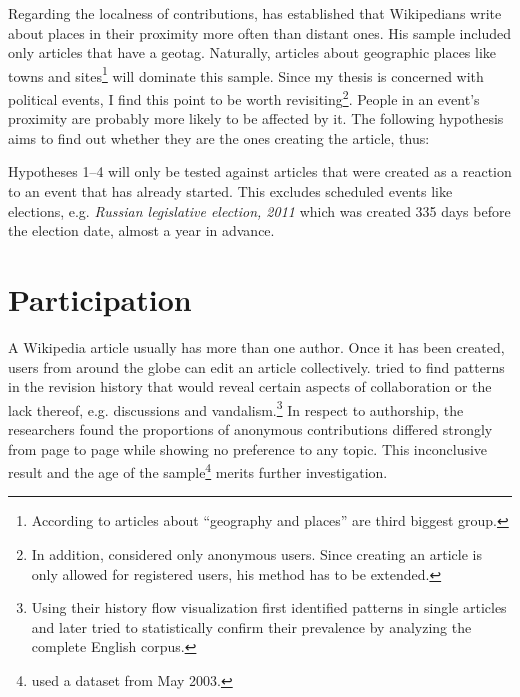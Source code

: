 
Regarding the localness of contributions, \textcite[57]{hardy2011volunteered} has established that Wikipedians write about places in their proximity more often than distant ones.
His sample included only articles that have a geotag.
Naturally, articles about geographic places like towns and sites\footnote{According to \textcite{kittur2009s} articles about ``geography and places'' are third biggest group.} will dominate this sample.
Since my thesis is concerned with political events, I find this point to be worth revisiting\footnote{In addition, \textcite[61]{hardy2011volunteered} considered only anonymous users. Since creating an article is only allowed for registered users, his method has to be extended.}.
People in an event's proximity are probably more likely to be affected by it.
The following hypothesis aims to find out whether they are the ones creating the article, thus:


Hypotheses 1--4 will only be tested against articles that were created as a reaction to an event that has already started. 
This excludes scheduled events like elections, e.g. \emph{Russian legislative election, 2011} which was created 335 days before the election date, almost a year in advance.


\section{Participation}\label{sec:participation}

A Wikipedia article usually has more than one author.
Once it has been created, users from around the globe can edit an article collectively.
\textcite{viegas2004history} tried to find patterns in the revision history that would reveal certain aspects of collaboration or the lack thereof, e.g. discussions and vandalism.\footnote{Using their history flow visualization \textcite{viegas2004history} first identified patterns in single articles and later tried to statistically confirm their prevalence by analyzing the complete English corpus.} 
In respect to authorship, the researchers found the proportions of anonymous contributions differed strongly from page to page while showing no preference to any topic.
This inconclusive result and the age of the sample\footnote{\textcite{viegas2004history} used a dataset from May 2003.} merits further investigation. 

